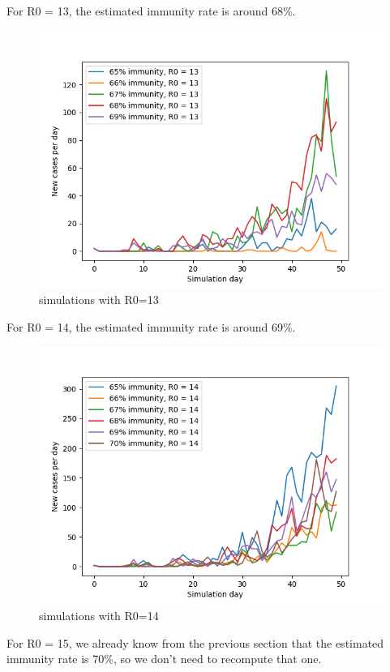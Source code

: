 \documentclass[runningheads]{llncs}
\begin{document}
\newpage
\noindent
For R0 = 13, the estimated immunity rate is around 68\%.
\begin{figure}
	\includegraphics[width=\textwidth]{test_R0_13.png}
	\caption{simulations with R0=13}
\end{figure}

\newpage
\noindent
For R0 = 14, the estimated immunity rate is around 69\%.
\begin{figure}
	\includegraphics[width=\textwidth]{test_R0_14.png}
	\caption{simulations with R0=14}
\end{figure}

\newpage
\noindent

For R0 = 15, we already know from the previous section that the estimated immunity rate is 70\%, so we don't need to recompute that one.
\end{document}
